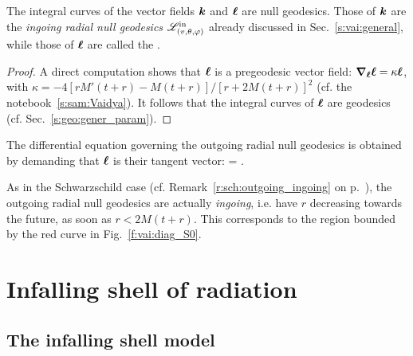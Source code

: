\begin{greybox}
The integral curves of the vector fields $\bm{k}$ and $\bm{\ell}$ are null geodesics.
Those of $\bm{k}$ are the \emph{ingoing radial null geodesics}
$\mathscr{L}^{\rm in}_{(v,\theta,\varphi)}$ already discussed in Sec.~\ref{s:vai:general},
while those of $\bm{\ell}$ are called the .
\end{greybox}

\begin{proof}
A direct computation shows that $\bm{\ell}$ is a pregeodesic vector field:
$\bm{\nabla}_{\bm{\ell}} \bm{\ell} = \kappa \bm{\ell}$, with $\kappa = - 4 [rM'(t+r) - M(t+r)]/[r + 2M(t+r)]^2$
(cf. the notebook~\ref{s:sam:Vaidya}). It follows that the integral curves of
$\bm{\ell}$ are geodesics (cf. Sec.~\ref{s:geo:gener_param}).
\end{proof}
The differential equation governing the outgoing radial null geodesics
is obtained by demanding that $\bm{\ell}$ is their tangent vector:
\be \label{e:vai:ODE_outgoing_null}
     =  .
\ee

\begin{remark}
As in the Schwarzschild case (cf. Remark~\ref{r:sch:outgoing_ingoing}
on p.~\pageref{r:sch:outgoing_ingoing}),
the outgoing radial null geodesics are actually \emph{ingoing}, i.e. have $r$ decreasing towards the future,
as soon as $r < 2 M(t+r)$. This corresponds to the region bounded by the red curve in Fig.~\ref{f:vai:diag_S0}.
\end{remark}


\section{Infalling shell of radiation} \label{s:vai:infall}

\subsection{The infalling shell model} \label{s:vai:infalling_shell}

